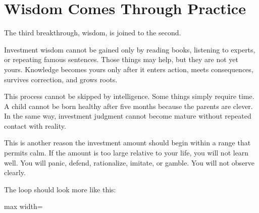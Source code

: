 \section*{Wisdom Comes Through Practice}

The third breakthrough, wisdom, is joined to the second.

Investment wisdom cannot be gained only by reading books, listening to experts, or repeating famous sentences. Those things may help, but they are not yet yours. Knowledge becomes yours only after it enters action, meets consequences, survives correction, and grows roots.

This process cannot be skipped by intelligence. Some things simply require time. A child cannot be born healthy after five months because the parents are clever. In the same way, investment judgment cannot become mature without repeated contact with reality.

This is another reason the investment amount should begin within a range that permits calm. If the amount is too large relative to your life, you will not learn well. You will panic, defend, rationalize, imitate, or gamble. You will not observe clearly.

The loop should look more like this:

\begin{center}
\begin{adjustbox}{max width=\linewidth}
\end{adjustbox}
\end{center}

